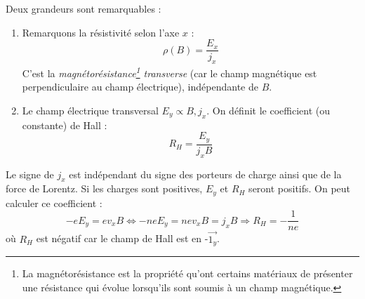 Deux grandeurs sont remarquables :
\begin{enumerate}
\item Remarquons la résistivité selon l'axe $x$ :
\begin{equation}
\rho(B) = \dfrac{E_x}{j_x}
\end{equation}
C'est la \textit{magnétorésistance\footnote{La magnétorésistance est la propriété 
qu'ont certains matériaux de présenter une résistance qui évolue lorsqu'ils sont 
soumis à un champ magnétique.} transverse} (car le champ magnétique est 
perpendiculaire au champ électrique), indépendante de $B$.

\item Le champ électrique transversal $E_y \propto B, j_x$. On définit le 
coefficient (ou constante) de Hall :
\begin{equation}
R_H = \dfrac{E_y}{j_xB}
\end{equation}
\end{enumerate}
Le signe de $j_x$ est indépendant du signe des porteurs de charge ainsi que de la force
de Lorentz. Si les charges sont positives, $E_y$ et $R_H$ seront positifs. On peut 
calculer ce coefficient :
\begin{equation}
-eE_y = ev_xB \Leftrightarrow -neE_y = nev_xB = j_xB \Longrightarrow R_H = -\frac{1}{ne}
\end{equation}
où $R_H$ est négatif car le champ de Hall est en -$\vec{1_y}$.
